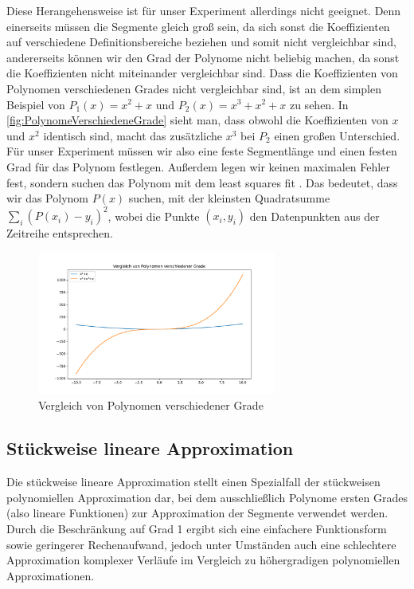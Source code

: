 Diese Herangehensweise ist für unser Experiment allerdings nicht geeignet. Denn einerseits müssen die Segmente gleich groß sein, da sich sonst die Koeffizienten auf verschiedene Definitionsbereiche beziehen und somit nicht vergleichbar sind, andererseits können wir den Grad der Polynome nicht beliebig machen, da sonst die Koeffizienten nicht miteinander vergleichbar sind. Dass die Koeffizienten von Polynomen verschiedenen Grades nicht vergleichbar sind, ist an dem simplen Beispiel von $P_1(x)=x^2+x$ und $P_2(x)=x^3+x^2+x$ zu sehen. In \autoref{fig:PolynomeVerschiedeneGrade} sieht man, dass obwohl die Koeffizienten von $x$ und $x^2$ identisch sind, macht das zusätzliche $x^3$ bei $P_2$ einen großen Unterschied. Für unser Experiment müssen wir also eine feste Segmentlänge und einen festen Grad für das Polynom festlegen. Außerdem legen wir keinen maximalen Fehler fest, sondern suchen das Polynom mit dem least squares fit \cite[Def. least squares fitting]{leastSquares}. Das bedeutet, dass wir das Polynom $P(x)$ suchen, mit der kleinsten Quadratsumme $\sum_i (P(x_i)-y_i)^2$, wobei die Punkte $(x_i,y_i)$ den Datenpunkten aus der Zeitreihe entsprechen.
\begin{figure}[bth] 
  \centering
  \includegraphics[width=0.7\textwidth]{Graphics/ComparissonDifferentPolDegrees.pdf}
  \caption{Vergleich von Polynomen verschiedener Grade}
  \label{fig:PolynomeVerschiedeneGrade}
\end{figure}

\subsection{Stückweise lineare Approximation}
Die stückweise lineare Approximation stellt einen Spezialfall der stückweisen polynomiellen Approximation dar, bei dem ausschließlich Polynome ersten Grades (also lineare Funktionen) zur Approximation der Segmente verwendet werden.
Durch die Beschränkung auf Grad 1 ergibt sich eine einfachere Funktionsform sowie geringerer Rechenaufwand, jedoch unter Umständen auch eine schlechtere Approximation komplexer Verläufe im Vergleich zu höhergradigen polynomiellen Approximationen.


